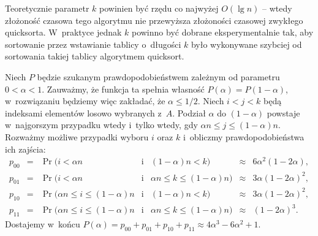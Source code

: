 Teoretycznie parametr $k$ powinien być rzędu co najwyżej $O(\lg n)$ -- wtedy złożoność czasowa tego algorytmu nie przewyższa złożoności czasowej zwykłego quicksorta.
W~praktyce jednak $k$ powinno być dobrane eksperymentalnie tak, aby sortowanie przez wstawianie tablicy o~długości $k$ było wykonywane szybciej od sortowania takiej tablicy algorytmem quicksort.

\exercise %
Niech $P$ będzie szukanym prawdopodobieństwem zależnym od parametru $0<\alpha<1$.
Zauważmy, że funkcja ta spełnia własność $P(\alpha)=P(1-\alpha)$, w~rozwiązaniu będziemy więc zakładać, że $\alpha\le1/2$.
Niech $i<j<k$ będą indeksami elementów losowo wybranych z~$A$.
Podział $\alpha$ do $(1-\alpha)$ powstaje w~najgorszym przypadku wtedy i~tylko wtedy, gdy $\alpha n\le j\le(1-\alpha)n$.
Rozważmy możliwe przypadki wyboru $i$ oraz $k$ i~obliczmy prawdopodobieństwa ich zajścia:
\[
	\begin{array}{rcrclcl}
	p_{00} &=& \Pr\bigl(i<\alpha n &\text{i}& (1-\alpha)n<k\bigr) &\approx& 6\alpha^2(1-2\alpha), \\[1mm]
	p_{01} &=& \Pr\bigl(i<\alpha n &\text{i}& \alpha n\le k\le(1-\alpha)n\bigr) &\approx& 3\alpha(1-2\alpha)^2, \\[1mm]
	p_{10} &=& \Pr\bigl(\alpha n\le i\le(1-\alpha)n &\text{i}& (1-\alpha)n<k\bigr) &\approx& 3\alpha(1-2\alpha)^2, \\[1mm]
	p_{11} &=& \Pr\bigl(\alpha n\le i\le(1-\alpha)n &\text{i}& \alpha n\le k\le(1-\alpha)n\bigr) &\approx& (1-2\alpha)^3.
	\end{array}
\]
Dostajemy w~końcu $P(\alpha)=p_{00}+p_{01}+p_{10}+p_{11}\approx4\alpha^3-6\alpha^2+1$.
